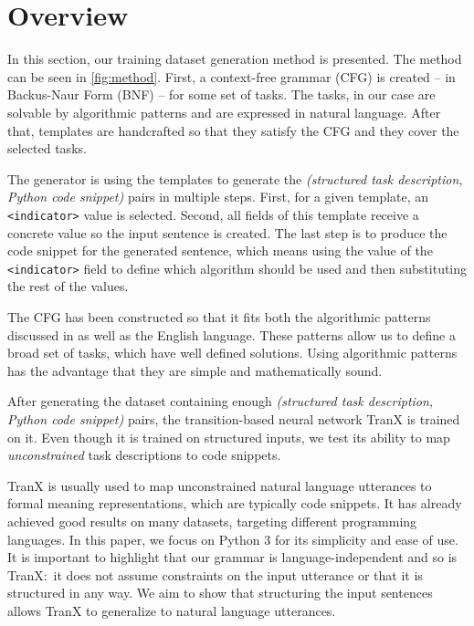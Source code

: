 \section{Overview}


In this section, our training dataset generation method is presented. The method can be seen in \cref{fig:method}. First, a context-free grammar (CFG) is created -- in Backus-Naur Form (BNF)\cite{bnf} -- for some set of tasks. The tasks, in our case are solvable by algorithmic patterns and are expressed in natural language. After that, templates are handcrafted so that they satisfy the CFG and they cover the selected tasks.

The generator is using the templates to generate the \emph{(structured task
description, Python code snippet)} pairs in multiple steps. First, for a given
template, an \verb|<indicator>| value is selected. Second, all fields of this
template receive a concrete value so the input sentence is created. The last
step is to produce the code snippet for the generated sentence, which means
using the value of the \verb|<indicator>| field to define which algorithm should
be used and then substituting the rest of the values.

The CFG has been constructed so that it fits both the algorithmic patterns
discussed in \cite{progT} as well as the English language. These patterns allow
us to define a broad set of tasks, which have well defined solutions. Using
algorithmic patterns has the advantage that they are simple and mathematically
sound.

After generating the dataset containing enough \emph{(structured task description, Python code snippet)} pairs, the transition-based neural network TranX \cite{tranx} is trained on it.
Even though it is trained on structured inputs, we test its ability to map \emph{unconstrained} task descriptions to code snippets.

TranX is usually used to map unconstrained natural language utterances to formal
meaning representations, which are typically code snippets. It has already
achieved good results on many datasets, targeting different programming
languages. In this paper, we focus on Python 3 for its simplicity and ease of
use. It is important to highlight that our grammar is language-independent and
so is TranX:~it does not assume constraints on the input utterance or that it is
structured in any way. We aim to show that structuring the input sentences
allows TranX to generalize to natural language utterances.

